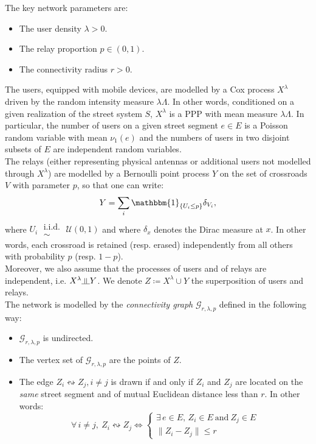\documentclass[11pt,a4paper]{amsart}
\theoremstyle{exampstyle}
\theoremstyle{exampnotations}
\newcommand{\indep}{\rotatebox[origin=c]{90}{$\models$}}
\begin{document}
The key network parameters are:
\begin{itemize}
\item The user density $\lambda > 0$.
\item The relay proportion $p \in \left(0,1\right)$.
\item The connectivity radius $r > 0$. \\
\end{itemize}

The users, equipped with mobile devices, are modelled by a Cox process $X^{\lambda}$ driven by the random intensity measure $\lambda \Lambda$. In other words, conditioned on a given realization of the street system $S$, $X^{\lambda}$ is a PPP with mean measure $\lambda \Lambda$. In particular, the number of users on a given street segment $e \in E$ is a Poisson random variable with mean $\nu_{1}(e)$ and the numbers of users in two disjoint subsets of $E$ are independent random variables. \\
\indent The relays (either representing physical antennas or additional users not modelled through $X^{\lambda}$) are modelled by a Bernoulli point process $Y$ on the set of crossroads $V$ with parameter $p$, so that one can write:
\begin{equation*}
Y = \sum_{i} \mathbbm{1}_{\lbrace U_{i} \leq p \rbrace } \delta_{V_{i}},
\end{equation*}
where $U_{i} \;\substack{ \text{i.i.d.} \\ \sim} \; \mathcal{U}(0,1)$ and where $\delta_{x}$ denotes the Dirac measure at $x$. In other words, each crossroad is retained (resp. erased) independently from all others with probability $p$ (resp. $1-p$). \\
\noindent Moreover, we also assume that the processes of users and of relays are independent, i.e. $X^{\lambda} \indep Y$. We denote $Z \coloneqq X^{\lambda} \cup Y$ the superposition of users and relays. \\

The network is modelled by the \emph{connectivity graph} $\mathcal{G}_{r,\lambda,p}$ defined in the following way:
\begin{itemize}
\item $\mathcal{G}_{r,\lambda,p}$ is undirected.
\item The vertex set of $\mathcal{G}_{r,\lambda,p}$ are the points of $Z$.
\item The edge $Z_{i} \leftrightsquigarrow Z_{j}, i \neq j$ is drawn if and only if $Z_{i}$ and $Z_{j}$ are located on the \emph{same} street segment and of mutual Euclidean distance less than $r$. In other words:
\begin{equation}
\label{connectivity_mechanism}
\forall \, i \neq j, \: Z_{i} \leftrightsquigarrow Z_{j} \Leftrightarrow 
\left\{
\begin{array}{l}
\exists \, e \in E, \, Z_{i} \in E  \  \text{and} \  Z_{j} \in E \\
\lVert Z_{i} - Z_{j} \rVert \leq r
\end{array}
\right.
\end{equation}
\end{itemize}
\end{document}
